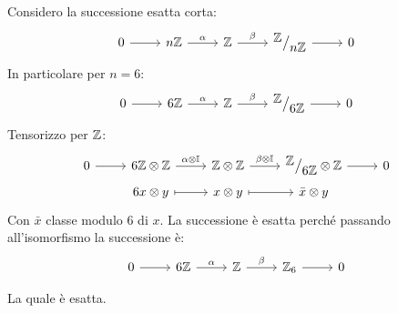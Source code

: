\begin{example}
  Considero la successione esatta corta:
  \[
    \begin{tikzcd}
      0 \rar{} & n \Z \rar{\alpha} & \Z \rar{\beta} & \quot{\Z}{n \Z} \rar & 0
    \end{tikzcd}
  \]
  In particolare per $ n = 6 $:
  \[
    \begin{tikzcd}
      0 \rar{} & 6 \Z \rar{\alpha} & \Z \rar{\beta} & \quot{\Z}{6 \Z} \rar & 0
    \end{tikzcd}
  \]
  Tensorizzo per $ \mathbb{Z} $:
  \[
    \begin{tikzcd}[nodes = {row sep = 3pt}]
      0 \rar{} & 6 \Z \otimes \Z \rar{\alpha \otimes \Id{}} & \Z \otimes \Z \rar{\beta \otimes \Id{}} & \quot{\Z}{6 \Z} \otimes \Z \rar & 0 \\
      {}  & 6x \otimes y \rar[mapsto] & x \otimes y \rar[mapsto] & \bar{x} \otimes y
    \end{tikzcd}
  \]
  Con $ \bar{x} $ classe modulo 6 di $ x $. La successione è
  esatta perché passando all'isomorfismo la successione è:
  \[
    \begin{tikzcd}[nodes = {row sep = 3pt}]
      0 \rar{} & 6 \Z \rar{\alpha} & \Z \rar{\beta} & \Z_6 \rar & 0 \\
    \end{tikzcd}
  \]
  La quale è esatta.
\end{example}
